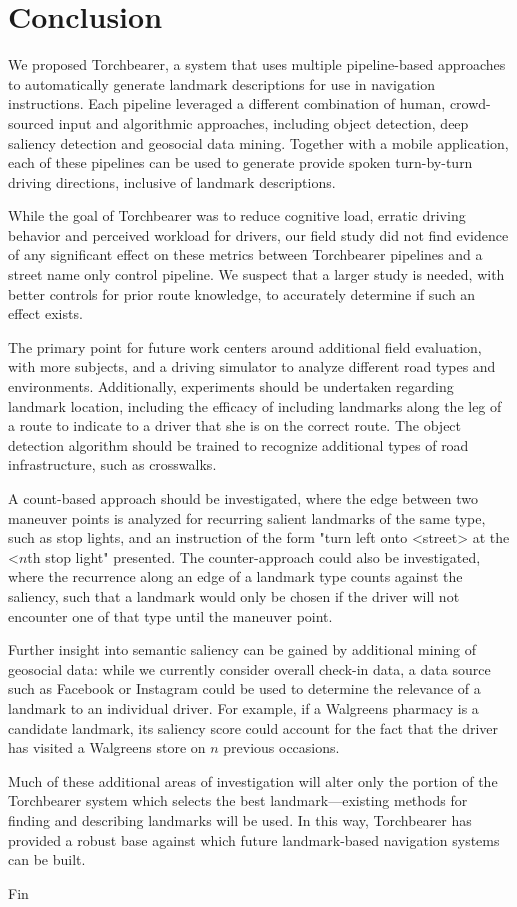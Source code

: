 \chapter{Conclusion}\label{conclusion}

We proposed Torchbearer, a system that uses multiple pipeline-based approaches to automatically generate landmark descriptions for use in navigation instructions. Each pipeline leveraged a different combination of human, crowd-sourced input and algorithmic approaches, including object detection, deep saliency detection and geosocial data mining. Together with a mobile application, each of these pipelines can be used to generate provide spoken turn-by-turn driving directions, inclusive of landmark descriptions.

While the goal of Torchbearer was to reduce cognitive load, erratic driving behavior and perceived workload for drivers, our field study did not find evidence of any significant effect on these metrics between Torchbearer pipelines and a street name only control pipeline. We suspect that a larger study is needed, with better controls for prior route knowledge, to accurately determine if such an effect exists.

The primary point for future work centers around additional field evaluation, with more subjects, and a driving simulator to analyze different road types and environments. Additionally, experiments should be undertaken regarding landmark location, including the efficacy of including landmarks along the leg of a route to indicate to a driver that she is on the correct route. The object detection algorithm should be trained to recognize additional types of road infrastructure, such as crosswalks.

A count-based approach should be investigated, where the edge between two maneuver points is analyzed for recurring salient landmarks of the same type, such as stop lights, and an instruction of the form "turn left onto <street> at the <$n$th stop light" presented. The counter-approach could also be investigated, where the recurrence along an edge of a landmark type counts against the saliency, such that a landmark would only be chosen if the driver will not encounter one of that type until the maneuver point.

Further insight into semantic saliency can be gained by additional mining of geosocial data: while we currently consider overall check-in data, a data source such as Facebook or Instagram could be used to determine the relevance of a landmark to an individual driver. For example, if a Walgreens pharmacy is a candidate landmark, its saliency score could account for the fact that the driver has visited a Walgreens store on $n$ previous occasions.

Much of these additional areas of investigation will alter only the portion of the Torchbearer system which selects the best landmark---existing methods for finding and describing landmarks will be used. In this way, Torchbearer has provided a robust base against which future landmark-based navigation systems can be built.

Fin